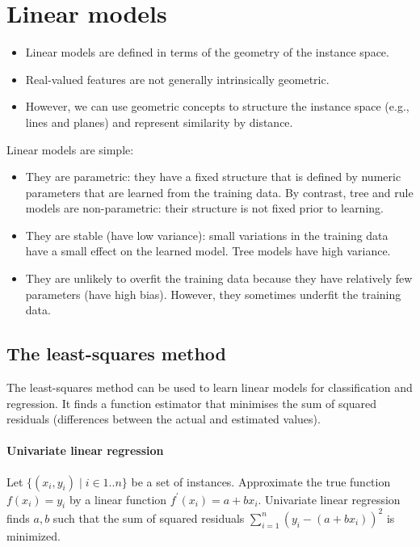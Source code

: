 \section{Linear models}

\begin{itemize}
  \item Linear models are defined in terms of the geometry of the instance space.
  \item Real-valued features are not generally intrinsically geometric.
  \item However, we can use geometric concepts to structure the instance space
        (e.g., lines and planes) and represent similarity by distance.
\end{itemize}

Linear models are simple:

\begin{itemize}
  \item They are parametric: they have a fixed structure that is defined by
        numeric parameters that are learned from the training data.
        By contrast, tree and rule models are non-parametric: their structure is not
        fixed prior to learning.
  \item They are stable (have low variance): small variations in the training
        data have a small effect on the learned model.
        Tree models have high variance.
  \item They are unlikely to overfit the training data because they have
        relatively few parameters (have high bias).
        However, they sometimes underfit the training data.
\end{itemize}

\subsection{The least-squares method}

The least-squares method can be used to learn linear models for classification
and regression.
It finds a function estimator that minimises the sum of squared residuals
(differences between the actual and estimated values).

\paragraph{Univariate linear regression}

Let $\{ (x_i, y_i) \mid i \in 1 .. n \}$ be a set of instances.
Approximate the true function $f(x_i) = y_i$ by a linear function
$f^\prime(x_i) = a + b x_i$.
Univariate linear regression finds $a, b$ such that the sum of squared
residuals $\sum_{i = 1}^{n} (y_i - (a + b x_i))^2$ is minimized.

